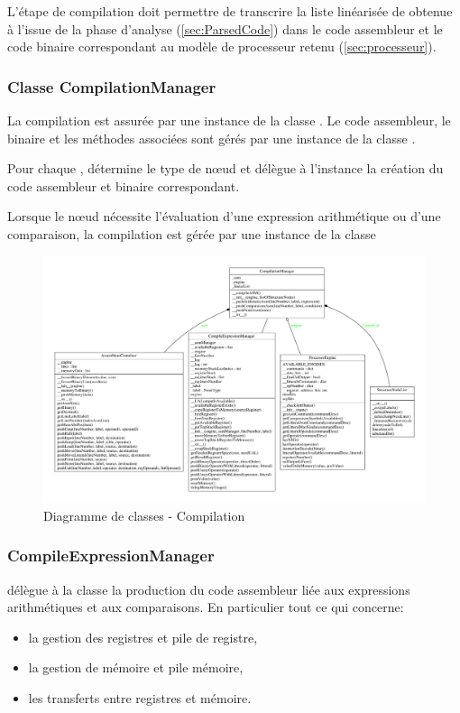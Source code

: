 L'étape de compilation doit permettre de transcrire la liste linéarisée de  obtenue à l'issue de la phase d'analyse (\cref{sec:ParsedCode}) dans le code assembleur et le code binaire correspondant au modèle de processeur retenu (\cref{sec:processeur}).

\subsubsection{Classe CompilationManager}

La compilation est assurée par une instance de la classe . Le code assembleur, le binaire et les méthodes associées sont gérés par une instance de la classe .

Pour chaque ,  détermine le type de n\oe ud et délègue à l'instance  la création du code assembleur et binaire correspondant.

Lorsque le n\oe ud nécessite l'évaluation d'une expression arithmétique ou d'une comparaison, la compilation est gérée par une instance de la classe 

\begin{figure}[h!]
	\vspace{-1cm}
	\centering
	\includegraphics[width=\textwidth]{./Pictures/CompilationManager.pdf}
	\caption{\label{fig:class_CompileManager}Diagramme de classes - Compilation}
\end{figure}

\subsubsection{CompileExpressionManager}
 délègue à la classe la production du code assembleur liée aux expressions arithmétiques et aux comparaisons. En particulier tout ce qui concerne:
\begin{itemize}
	\item la gestion des registres et pile de registre,
	\item la gestion de mémoire et pile mémoire,
	\item les transferts entre registres et mémoire.
\end{itemize}


